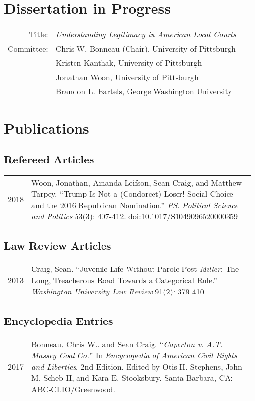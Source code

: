 \documentclass[12pt,letterpaper]{article}
\begin{document}
\section*{\sf Dissertation in Progress}
\begin{tabularx}{\textwidth}{@{}DX@{}}
  Title: & {\em Understanding Legitimacy in American Local Courts} \\
  Committee: & Chris W. Bonneau (Chair), University of Pittsburgh \\
  & Kristen Kanthak, University of Pittsburgh \\
  & Jonathan Woon, University of Pittsburgh \\
  & Brandon L. Bartels, George Washington University
\end{tabularx} \par\bigskip

\section*{\sf Publications}
\subsection*{\sf Refereed Articles}
\begin{tabularx}{\textwidth}{@{}DX@{}}
  2018 & Woon, Jonathan, Amanda Leifson, Sean Craig, and Matthew Tarpey. %
    ``Trump Is Not a (Condorcet) Loser! Social Choice and the 2016 Republican Nomination.'' %
    {\em PS: Political Science and Politics} 53(3): 407-412. %
    doi:10.1017/S1049096520000359 \bigskip \\
\end{tabularx} \par\bigskip
\subsection*{\sf Law Review Articles}
\begin{tabularx}{\textwidth}{@{}DX@{}}
  2013 & Craig, Sean. %
    ``Juvenile Life Without Parole Post-{\em Miller}: %
    The Long, Treacherous Road Towards a Categorical Rule.'' %
    {\em Washington University Law Review} 91(2): 379-410. \par\bigskip \\
\end{tabularx}
\subsection*{\sf Encyclopedia Entries}
\begin{tabularx}{\textwidth}{@{}DX@{}}
  2017 & Bonneau, Chris W., and Sean Craig. %
  ``{\em Caperton v. A.T. Massey Coal Co.}'' %
  In {\em Encyclopedia of American Civil Rights and Liberties}. 2nd Edition. %
  Edited by Otis H. Stephens, John M. Scheb II, and Kara E. Stooksbury. %
  Santa Barbara, CA: ABC-CLIO/Greenwood. \par\bigskip \\
\end{tabularx}
\end{document}
